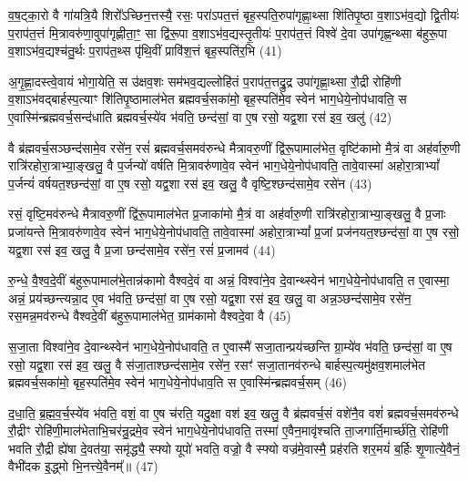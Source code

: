 {\anuvakamend[{अ॒स्मा॒ इन्द्र॑मे॒वैष स॑जा॒ता विश्वा॑ने॒व दे॒वान्थ्स्वेन॑ भाग॒धेये॒नोप॑धावति॒ त ए॒वास्मै᳚ प्राजाप॒त्यो हि त्रीणि॑ च॥ (6)॥}]}

व॒ष॒ट्का॒रो वै गा॑यत्रि॒यै शिरो᳚\-ऽच्छिन॒त्तस्यै॒ रसः॒ परा॑\-ऽपत॒त्तं बृह॒स्पति॒रुपा॑गृह्णा॒थ्सा शि॑तिपृ॒ष्ठा व॒शा\-ऽभ॑व॒द्यो द्वि॒तीयः॑ प॒राप॑त॒त्तं मि॒त्रावरु॑णा॒वुपा॑गृह्णीता॒ꣳ॒ सा द्वि॑रू॒पा व॒शा\-ऽभ॑व॒द्यस्तृ॒तीयः॑ प॒राप॑त॒त्तं विश्वे॑ दे॒वा उपा॑गृह्ण॒न्थ्सा ब॑हुरू॒पा व॒शा\-ऽभ॑व॒द्यश्च॑तु॒र्थः प॒राप॑त॒थ्स पृ॑थि॒वीं प्रावि॑श॒त्तं बृह॒स्पति॑र॒भि (41)

अ॒गृ॒ह्णा॒दस्त्वे॒वायं भोगा॒येति॒ स उ॑क्षव॒शः सम॑भव॒द्यल्लोहि॑तं प॒राप॑त॒त्तद्रु॒द्र उपा॑गृह्णा॒थ्सा रौ॒द्री रोहि॑णी व॒शा\-ऽभ॑व\-द्बार्\mbox{}हस्प॒त्याꣳ शि॑तिपृ॒ष्ठामाल॑भेत ब्रह्मवर्च॒सका॑मो॒ बृह॒स्पति॑मे॒व स्वेन॑ भाग॒धेये॒नोप॑धावति॒ स ए॒वास्मि॑न्ब्रह्म\-वर्च॒सन्द॑धाति ब्रह्मवर्च॒स्ये॑व भ॑वति॒ छन्द॑सां॒ वा ए॒ष रसो॒ यद्व॒शा रस॑ इव॒ खलु॑ (42)

वै ब्र॑ह्मवर्च॒सञ्छन्द॑सामे॒व रसे॑न॒ रसं॑ ब्रह्मवर्च॒समव॑रुन्धे मैत्रावरु॒णीं द्वि॑रू॒पामाल॑भेत॒ वृष्टि॑कामो मै॒त्रं वा अह॑र्वारु॒णी रात्रि॑रहोरा॒त्राभ्या॒ङ्खलु॒ वै प॒र्जन्यो॑ वर्\mbox{}षति मि॒त्रावरु॑णावे॒व स्वेन॑ भाग॒धेये॒नोप॑धावति॒ तावे॒वास्मा॑ अहोरा॒त्रा\-भ्यां᳚ प॒र्जन्यं॑ वर्\mbox{}षयत॒श्छन्द॑सां॒ वा ए॒ष रसो॒ यद्व॒शा रस॑ इव॒ खलु॒ वै वृष्टि॒श्छन्द॑सामे॒व रसे॑न (43)

रसं॒ वृष्टि॒मव॑रुन्धे मैत्रावरु॒णीं द्वि॑रू॒पामाल॑भेत प्र॒जाका॑मो मै॒त्रं वा अह॑र्वारु॒णी रात्रि॑रहोरा॒त्राभ्या॒ङ्खलु॒ वै प्र॒जाः प्रजा॑यन्ते मि॒त्रावरु॑णावे॒व स्वेन॑ भाग॒धेये॒नोप॑धावति॒ तावे॒वास्मा॑ अहोरा॒त्रा\-भ्यां᳚ प्र॒जां प्रज॑नयत॒श्छन्द॑सां॒ वा ए॒ष रसो॒ यद्व॒शा रस॑ इव॒ खलु॒ वै प्र॒जा छन्द॑सामे॒व रसे॑न॒ रसं॑ प्र॒जामव॑ (44)

रु॒न्धे॒ वै॒श्व॒दे॒वीं ब॑हुरू॒पामाल॑भे॒तान्न॑कामो वैश्वदे॒वं वा अन्नं॒ विश्वा॑ने॒व दे॒वान्थ्स्वेन॑ भाग॒धेये॒नोप॑धावति॒ त ए॒वास्मा॒ अन्नं॒ प्रय॑च्छन्त्यन्ना॒द ए॒व भ॑वति॒ छन्द॑सां॒ वा ए॒ष रसो॒ यद्व॒शा रस॑ इव॒ खलु॒ वा अन्न॒ञ्छन्द॑सामे॒व रसे॑न॒ रस॒मन्न॒मव॑रुन्धे वैश्वदे॒वीं ब॑हुरू॒पामाल॑भेत॒ ग्राम॑कामो वैश्वदे॒वा वै (45)

स॒जा॒ता विश्वा॑ने॒व दे॒वान्थ्स्वेन॑ भाग॒धेये॒नोप॑धावति॒ त ए॒वास्मै॑ सजा॒तान्प्रय॑च्छन्ति ग्रा॒म्ये॑व भ॑वति॒ छन्द॑सां॒ वा ए॒ष रसो॒ यद्व॒शा रस॑ इव॒ खलु॒ वै स॑जा॒ताश्छन्द॑सामे॒व रसे॑न॒ रसꣳ॑ सजा॒तानव॑रुन्धे बार्\mbox{}हस्प॒त्यमु॑क्षव॒शमाल॑भेत ब्रह्मवर्च॒सका॑मो॒ बृह॒स्पति॑मे॒व स्वेन॑ भाग॒धेये॒नोप॑धाव॒ति स ए॒वास्मि॑न्ब्रह्मवर्च॒सम् (46)

द॒धा॒ति॒ ब्र॒ह्म॒व॒र्च॒स्ये॑व भ॑वति॒ वशं॒ वा ए॒ष च॑रति॒ यदु॒क्षा वश॑ इव॒ खलु॒ वै ब्र॑ह्मवर्च॒सं वशे॑नै॒व वशं॑ ब्रह्मवर्च॒समव॑रुन्धे रौ॒द्रीꣳ रोहि॑णी॒माल॑भेताभि॒चर॑न्रु॒द्रमे॒व स्वेन॑ भाग॒धेये॒नोप॑धावति॒ तस्मा॑ ए॒वैन॒मावृ॑श्चति ता॒जगार्ति॒मार्च्छ॑ति॒ रोहि॑णी भवति रौ॒द्री ह्ये॑षा दे॒वत॑या॒ समृ॑द्ध्यै॒ स्फ्यो यूपो॑ भवति॒ वज्रो॒ वै स्फ्यो वज्र॑मे॒वास्मै॒ प्रह॑रति शर॒मयं॑ ब॒र्\mbox{}हिः शृ॒णात्ये॒वैनं॒ वैभी॑दक इ॒द्ध्मो भि॒नत्त्ये॒वैनम्᳚॥ (47)

